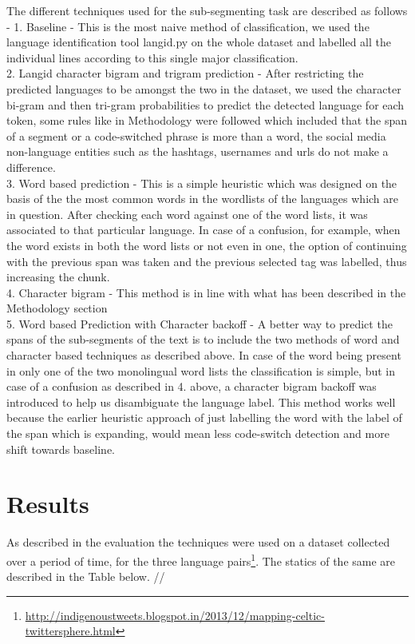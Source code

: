\documentclass[11pt]{article}
\begin{document}
The different techniques used for the sub-segmenting task are described as follows - 
1. Baseline - This is the most naive method of classification, we used the language identification tool langid.py \cite{lui2012langid} on the whole dataset and labelled all the individual lines according to this single major classification. \\
2. Langid character bigram and trigram prediction - After restricting the predicted languages to be amongst the two in the dataset, we used the character bi-gram and then tri-gram probabilities to predict the detected language for each token, some rules like in Methodology were followed which included that the span of a segment or a code-switched phrase is more than a word, the social media non-language entities such as the hashtags, usernames and urls do not make a difference. \\
3. Word based prediction - This is a simple heuristic which was designed on the basis of the the most common words in the wordlists of the languages which are in question. After checking each word against one of the word lists, it was associated to that particular language. In case of a confusion, for example, when the word exists in both the word lists or not even in one, the option of continuing with the previous span was taken and the previous selected tag was labelled, thus increasing the chunk. \\
4. Character bigram - This method is in line with what has been described in the Methodology section \\
5. Word based Prediction with Character backoff - A better way to predict the spans of the sub-segments of the text is to include the two methods of word and character based techniques as described above. In case of the word being present in only one of the two monolingual word lists the classification is simple, but in case of a confusion as described in 4. above, a character bigram backoff was introduced to help us disambiguate the language label. This method works well because the earlier heuristic approach of just labelling the word with the label of the span which is expanding, would mean less code-switch detection and more shift towards baseline. \\


\section{Results}
\label{sec:results}
As described in the evaluation the techniques were used on a dataset collected over a period of time, for the three language pairs\footnote{\url{http://indigenoustweets.blogspot.in/2013/12/mapping-celtic-twittersphere.html}}. The statics of the same are described in the Table below. // 
\end{document}
